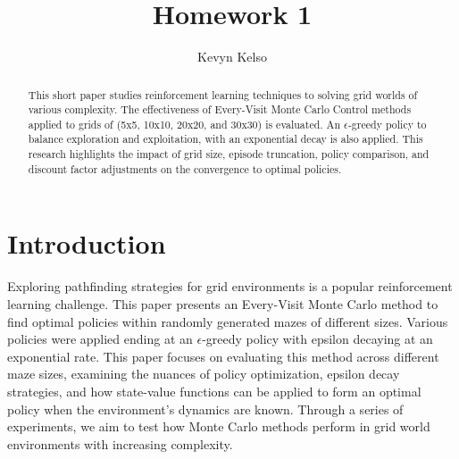\documentclass[letterpaper]{article} %
\title{Homework 1}
\author{
    Kevyn Kelso
}
\begin{document}
\maketitle

\begin{abstract}
This short paper studies reinforcement learning techniques to solving grid worlds of various complexity. The effectiveness of Every-Visit Monte Carlo Control methods applied to grids of (5x5, 10x10, 20x20, and 30x30) is evaluated. An $\epsilon$-greedy policy to balance exploration and exploitation, with an exponential decay is also applied. This research highlights the impact of grid size, episode truncation, policy comparison, and discount factor adjustments on the convergence to optimal policies.
\end{abstract}

\section{Introduction}
Exploring pathfinding strategies for grid environments is a popular reinforcement learning challenge. This paper presents an Every-Visit Monte Carlo method to find optimal policies within randomly generated mazes of different sizes. Various policies were applied ending at an $\epsilon$-greedy policy with epsilon decaying at an exponential rate. This paper focuses on evaluating this method across different maze sizes, examining the nuances of policy optimization, epsilon decay strategies, and how state-value functions can be applied to form an optimal policy when the environment's dynamics are known. Through a series of experiments, we aim to test how Monte Carlo methods perform in grid world environments with increasing complexity.
\end{document}
